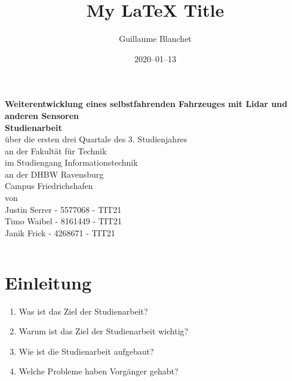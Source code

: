 \documentclass[12pt]{article}
\title{My LaTeX Title}
\author{Guillaume Blanchet}
\date{2020–01–13}
\begin{document}

\begin{titlepage}
	\begin{minipage}{6in}
	\vspace*{-2cm}
    \centering
    \raisebox{-0.5\height}{}
    \hfill
    \end{minipage}
	\begin{center}
		\vspace*{0.5cm}
		\LARGE\textbf{Weiterentwicklung eines selbstfahrenden Fahrzeuges mit Lidar
        und anderen Sensoren}\\
		\vspace*{2cm}
		\textbf{Studienarbeit}\\
		\normalsize
		{\"u}ber die ersten drei Quartale des 3. Studienjahres\\
		\vspace*{1.3cm}
		an der Fakult{\"a}t f{\"u}r Technik\\
		im Studiengang Informationstechnik\\
		\vspace*{1cm}
		an der DHBW Ravensburg\\
		Campus Friedrichshafen\\
		\vspace*{1cm}
		von\\
		Justin Serrer - 5577068 - TIT21 \\ 
		Timo Waibel - 8161449 - TIT21 \\
		Janik Frick - 4268671 - TIT21 \\
		\vspace*{2cm}
		\vfill
	\end{center}
	\begin{tabular}{ll}
	\end{tabular}
\end{titlepage}
\newpage
\tableofcontents
\newpage

\section{Einleitung}

\begin{enumerate}
    \item Was ist das Ziel der Studienarbeit?\\
    \item Warum ist das Ziel der Studienarbeit wichtig?\\
    \item Wie ist die Studienarbeit aufgebaut?\\
    \item Welche Probleme haben Vorgänger gehabt?\\

\end{enumerate}
\end{document}
